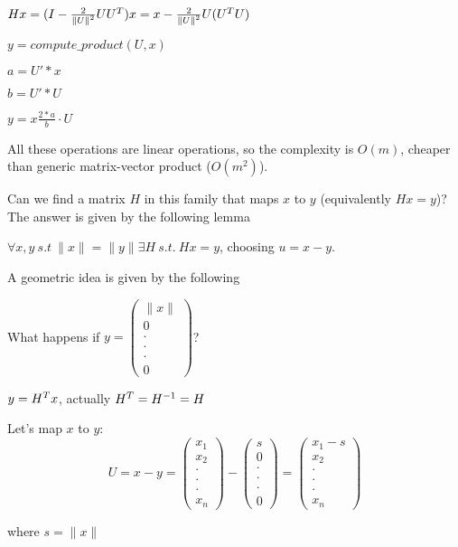 \documentclass[computational_mathematics.tex]{subfiles}
\begin{document}
\begin{example}
$Hx = (I - \frac{2}{{\|U\|}^{2}} U {U}^{T})x = x - \frac{2}{{\|U\|}^{2}} U ({U}^{T} U)$

$y = compute\_product(U,x)$

$a = U' * x$

$b=U' * U$

$y = x \frac{2*a}{b} \cdot U$

All these operations are linear operations, so the complexity is $O(m)$, cheaper than generic matrix-vector product ($O(m^2)$).
\end{example}

Can we find a matrix $H$ in this family that maps $x$ to $y$ (equivalently $Hx = y$)? The answer is given by the following lemma

\begin{lemma}
 $\forall x, y ~ s.t ~ \|x\| = \|y\| \exists H ~ s.t. ~ Hx = y$, choosing $u = x - y$.
\end{lemma}

A geometric idea is given by the following


What happens if $y = \begin{pmatrix} \|x\|\\ 0\\ \cdot\\ \cdot\\ \cdot\\ 0\end{pmatrix}$?
  
  $y = {H}^{T}x$, actually ${H}^{T} = {H}^{-1} = H$
  
  Let's map $x$ to $y$: 
  \[
    U = x - y =
  \begin{pmatrix} {}x_{1}\\ {x}_{2}\\ \cdot\\ \cdot\\ \cdot\\{x}_{n}\end{pmatrix} - \begin{pmatrix} s\\ 0\\ \cdot\\ \cdot\\ \cdot\\ 0 \end{pmatrix} = 
    \begin{pmatrix} {x}_{1}-s\\ {x}_{2}\\ \cdot\\ \cdot\\ \cdot\\ {x}_{n} \end{pmatrix}
  \]
      
      where $s = \|x\|$

\end{document}
